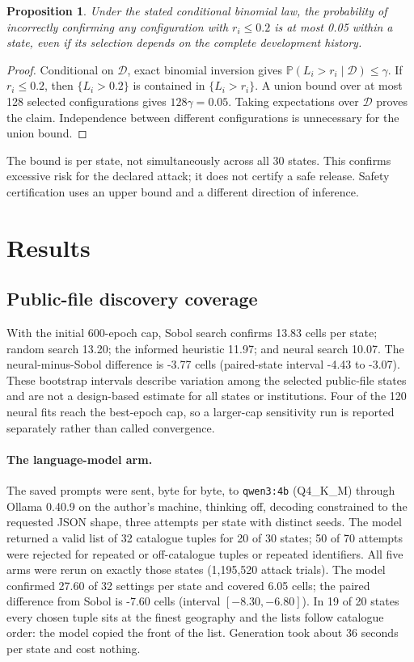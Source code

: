 \documentclass[11pt]{article}
\newtheorem{proposition}{Proposition}
\newcommand{\Prob}{\mathbb P}
\begin{document}
\begin{proposition}
Under the stated conditional binomial law, the probability of incorrectly confirming any configuration with $r_i\leq0.2$ is at most 0.05 within a state, even if its selection depends on the complete development history.
\end{proposition}
\begin{proof}
Conditional on $\mathcal D$, exact binomial inversion gives $\Prob(L_i>r_i\mid\mathcal D)\leq\gamma$. If $r_i\leq0.2$, then $\{L_i>0.2\}$ is contained in $\{L_i>r_i\}$. A union bound over at most 128 selected configurations gives $128\gamma=0.05$. Taking expectations over $\mathcal D$ proves the claim. Independence between different configurations is unnecessary for the union bound.
\end{proof}
The bound is per state, not simultaneously across all 30 states. This confirms excessive risk for the declared attack; it does not certify a safe release. Safety certification uses an upper bound and a different direction of inference.

\section{Results}
\subsection{Public-file discovery coverage}

With the initial 600-epoch cap, Sobol search confirms 13.83 cells per state; random search 13.20; the informed heuristic 11.97; and neural search 10.07. The neural-minus-Sobol difference is -3.77 cells (paired-state interval -4.43 to -3.07). These bootstrap intervals describe variation among the selected public-file states and are not a design-based estimate for all states or institutions. Four of the 120 neural fits reach the best-epoch cap, so a larger-cap sensitivity run is reported separately rather than called convergence.



\paragraph{The language-model arm.} The saved prompts were sent, byte for byte, to \texttt{qwen3:4b} (Q4\_K\_M) through Ollama 0.40.9 on the author's machine, thinking off, decoding constrained to the requested JSON shape, three attempts per state with distinct seeds. The model returned a valid list of 32 catalogue tuples for 20 of 30 states; 50 of 70 attempts were rejected for repeated or off-catalogue tuples or repeated identifiers. All five arms were rerun on exactly those states (1,195,520 attack trials). The model confirmed 27.60 of 32 settings per state and covered 6.05 cells; the paired difference from Sobol is -7.60 cells (interval $[-8.30,-6.80]$). In 19 of 20 states every chosen tuple sits at the finest geography and the lists follow catalogue order: the model copied the front of the list. Generation took about 36 seconds per state and cost nothing.
\end{document}
